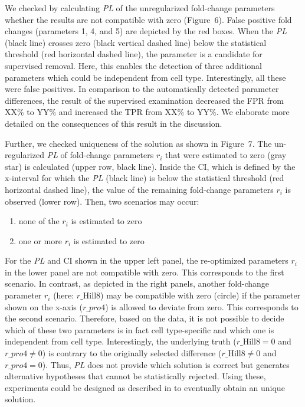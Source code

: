 \documentclass{bioinfo}
\begin{document}
We checked by calculating \emph{PL} of the unregularized fold-change parameters whether the results are not compatible with zero (Figure~6\vphantom{\ref{fig:06}}).
False positive fold changes (parameters 1, 4, and 5) are depicted by the red boxes.
When the \emph{PL} (black line) crosses zero (black vertical dashed line) below the statistical threshold (red horizontal dashed line), the parameter is a candidate for supervised removal.
Here, this enables the detection of three additional parameters which could be independent from cell type.
Interestingly, all these were false positives.
In comparison to the automatically detected parameter differences, the result of the supervised examination decreased the FPR from XX\% to YY\% and increased the TPR from XX\% to YY\%.
We elaborate more detailed on the consequences of this result in the discussion.

Further, we checked uniqueness of the solution as shown in Figure~7\vphantom{\ref{fig:07}}.
The un-regularized \emph{PL} of fold-change parameters $r_i$ that were estimated to zero (gray star) is calculated (upper row, black line).
Inside the CI, which is defined by the x-interval for which the \emph{PL} (black line) is below the statistical threshold (red horizontal dashed line), the value of the remaining fold-change parameters $r_i$ is observed (lower row).
Then, two scenarios may occur:
\begin{enumerate}
\item none of the $r_i$ is estimated to zero
\item one or more $r_i$ is estimated to zero
\end{enumerate}
For the \emph{PL} and CI shown in the upper left panel, the re-optimized parameters $r_i$ in the lower panel are not compatible with zero.
This corresponds to the first scenario.
In contrast, as depicted in the right panels, another fold-change parameter $r_i$ (here: $r\_\text{Hill}8$) may be compatible with zero (circle) if the parameter shown on the x-axis ($r\_{pro4}$) is allowed to deviate from zero.
This corresponds to the second scenario.
Therefore, based on the data, it is not possible to decide which of these two parameters is in fact cell type-specific and which one is independent from cell type.
Interestingly, the underlying truth ($r\_\text{Hill}8=0$ and $r\_{pro4}\neq0$) is contrary to the originally selected difference ($r\_\text{Hill}8\neq0$ and $r\_{pro4}=0$).
Thus, \emph{PL} does not provide which solution is correct but generates alternative hypotheses that cannot be statistically rejected.
Using these, experiments could be designed as described in \cite{Steiert12} to eventually obtain an unique solution.
\end{document}

